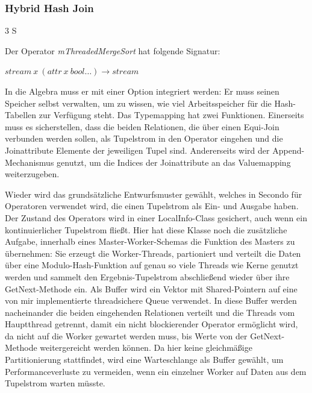 \documentclass[a4paper,12pt,twoside]{article}
\newcommand{\Fb}[1]{\textit{#1}} %
\begin{document}
{\subsubsection{Hybrid Hash Join} 3 S
\label{impl:hybrid}

Der Operator \Fb{mThreadedMergeSort} hat folgende Signatur:

$stream~x~(attr~x~bool \ldots) \longrightarrow stream$

In die Algebra muss er mit einer Option integriert werden: Er muss seinen Speicher selbst verwalten, um zu wissen, wie viel Arbeitsspeicher für die Hash-Tabellen zur Verfügung steht. Das Typemapping hat zwei Funktionen. Einerseits muss es sicherstellen, dass die beiden Relationen, die über einen Equi-Join verbunden werden sollen, als Tupelstrom in den Operator eingehen und die Joinattribute Elemente der jeweiligen Tupel sind. Andererseits wird der Append-Mechanismus genutzt, um die Indices der Joinattribute an das Valuemapping weiterzugeben.

Wieder wird das grundsätzliche Entwurfsmuster gewählt, welches in Secondo für Operatoren verwendet wird, die einen Tupelstrom als Ein- und Ausgabe haben. Der Zustand des Operators wird in einer LocalInfo-Class gesichert, auch wenn ein kontinuierlicher Tupelstrom fließt. Hier hat diese Klasse noch die zusätzliche Aufgabe, innerhalb eines Master-Worker-Schemas die Funktion des Masters zu übernehmen: Sie erzeugt die Worker-Threads, partioniert und verteilt die Daten über eine Modulo-Hash-Funktion auf genau so viele Threads wie Kerne genutzt werden und sammelt den Ergebnis-Tupelstrom abschließend wieder über ihre GetNext-Methode ein. Als Buffer wird ein Vektor mit Shared-Pointern auf eine von mir implementierte threadsichere Queue verwendet. In diese Buffer werden nacheinander die beiden eingehenden Relationen verteilt und die Threads vom Hauptthread getrennt, damit ein nicht blockierender Operator ermöglicht wird, da nicht auf die Worker gewartet werden muss, bis Werte von der GetNext-Methode weitergereicht werden können. Da hier keine gleichmäßige Partitionierung stattfindet, wird eine Warteschlange als Buffer gewählt, um Performanceverluste zu vermeiden, wenn ein einzelner Worker auf Daten aus dem Tupelstrom warten müsste.

}
\end{document}

